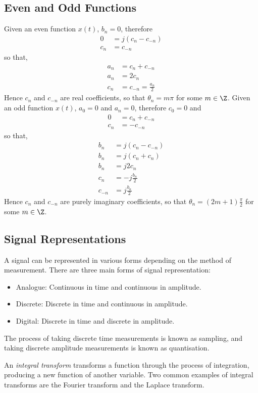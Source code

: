 \documentclass{article}
\begin{document}
\subsection{Even and Odd Functions}
Given an even function \(x\left( t \right)\), \(b_n = 0\), therefore
\begin{align*}
    0   & = j \left( c_n - c_{-n} \right) \\
    c_n & = c_{-n}
\end{align*}
so that,
\begin{align*}
    a_n & = c_n + c_{-n}           \\
    a_n & = 2 c_n                  \\
    c_n & = c_{-n} = \frac{a_n}{2}
\end{align*}
Hence \(c_n\) and \(c_{-n}\) are real coefficients, so that
\(\theta_n = m \pi\) for some \(m \in \Z\).  Given an odd function
\(x\left( t \right)\), \(a_0 = 0\) and \(a_n = 0\), therefore
\(c_0 = 0\) and
\begin{align*}
    0   & = c_n + c_{-n} \\
    c_n & = -c_{-n}
\end{align*}
so that,
\begin{align*}
    b_n    & = j \left( c_n - c_{-n} \right) \\
    b_n    & = j \left( c_n + c_n \right)    \\
    b_n    & = j 2 c_n                       \\
    c_n    & = -j \frac{b_n}{2}              \\
    c_{-n} & = j \frac{b_n}{2}
\end{align*}
Hence \(c_n\) and \(c_{-n}\) are purely imaginary coefficients, so that
\(\theta_n = \left( 2m + 1 \right) \frac{\pi}{2}\) for some \(m \in \Z\).
\subsection{Signal Representations}
A signal can be represented in various forms depending on the method of
measurement. There are three main forms of signal representation:
\begin{itemize}
    \item Analogue: Continuous in time and continuous in amplitude.
    \item Discrete: Discrete in time and continuous in amplitude.
    \item Digital: Discrete in time and discrete in amplitude.
\end{itemize}
The process of taking discrete time measurements is known as sampling,
and taking discrete amplitude measurements is known as quantisation.
\begin{definition}
    An \textit{integral transform} transforms a function through the
    process of integration, producing a new function of another variable.
    Two common examples of integral transforms are the Fourier transform
    and the Laplace transform.
\end{definition}
\end{document}

